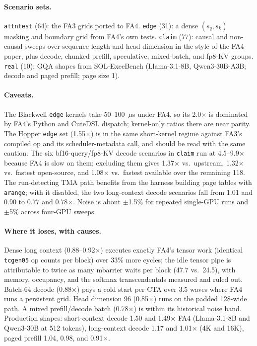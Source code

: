 \paragraph{Scenario sets.} \texttt{attntest} (64): the FA3 grids ported to FA4. \texttt{edge} (31):
a dense $(s_q,s_k)$ masking and boundary grid from FA4's own tests. \texttt{claim} (77): causal and
non-causal sweeps over sequence length and head dimension in the style of the FA4 paper, plus
decode, chunked prefill, speculative, mixed-batch, and fp8-KV groups. \texttt{real} (10): GQA shapes
from SOL-ExecBench (Llama-3.1-8B, Qwen3-30B-A3B; decode and paged prefill; page size 1).

\paragraph{Caveats.} The Blackwell \texttt{edge} kernels take 50--100~$\mu$s under FA4, so its
2.0$\times$ is dominated by FA4's Python and CuteDSL dispatch; kernel-only ratios there are near
parity. The Hopper \texttt{edge} set (1.55$\times$) is in the same short-kernel regime against
FA3's compiled op and its scheduler-metadata call, and should be read with the same caution. The six
bf16-query/fp8-KV decode scenarios in \texttt{claim} run at 4.5--9.9$\times$ because FA4 is slow on
them; excluding them gives 1.37$\times$ vs.\ upstream, 1.32$\times$ vs.\ fastest open-source, and
1.08$\times$ vs.\ fastest available over the remaining 118. The run-detecting TMA path benefits from
the harness building page tables with \texttt{arange}; with it disabled, the two long-context decode
scenarios fall from 1.01 and 0.90 to 0.77 and 0.78$\times$. Noise is about $\pm$1.5\% for repeated
single-GPU runs and $\pm$5\% across four-GPU sweeps.

\paragraph{Where it loses, with causes.} Dense long context (0.88--0.92$\times$) executes exactly
FA4's tensor work (identical \texttt{tcgen05} op counts per block) over 33\% more cycles; the idle
tensor pipe is attributable to twice as many mbarrier waits per block (47.7 vs.\ 24.5), with memory,
occupancy, and the softmax transcendentals measured and ruled out. Batch-64 decode (0.88$\times$)
pays a cold start per CTA over 3.5 waves where FA4 runs a persistent grid. Head dimension 96
(0.85$\times$) runs on the padded 128-wide path. A mixed prefill/decode batch (0.78$\times$) is within
its historical noise band. Production shapes: short-context decode 1.50 and 1.49$\times$ FA4
(Llama-3.1-8B and Qwen3-30B at 512 tokens), long-context decode 1.17 and 1.01$\times$ (4K and 16K),
paged prefill 1.04, 0.98, and 0.91$\times$.


